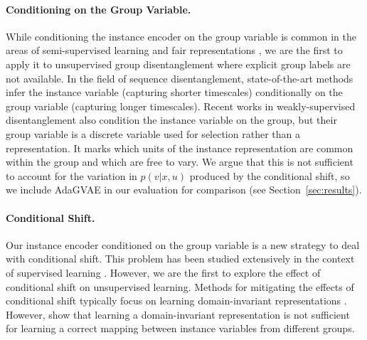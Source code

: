 \documentclass{article} %
\newcommand{\todo}[1]{\textcolor{red}{#1}}
\begin{document}
\paragraph{Conditioning on the Group Variable.} While conditioning the instance encoder on the group variable is common in the areas of semi-supervised learning and fair representations \citep{Kingma2014Semisupervised, Louizos2016TheVF}, we are the first to apply it to unsupervised group disentanglement where explicit group labels are not available. In the field of sequence disentanglement, state-of-the-art methods \citep{Hsu2017UnsupervisedLO, Denton2017UnsupervisedLO, Li2018DisentangledSA} infer the instance variable (capturing shorter timescales) conditionally on the group variable (capturing longer timescales). Recent works in weakly-supervised disentanglement \citep{Shu2020Weakly, Locatello2019ChallengingCA, Roeder2019Efficient} also condition the instance variable on the group, but their group variable is a discrete variable used for selection rather than a representation. It marks which units of the instance representation are common within the group and which are free to vary. We argue that this is not sufficient to account for the variation in $p(v | x, u)$ produced by the conditional shift, so we include AdaGVAE \citep{Locatello2020WeaklySupervisedDW} in our evaluation for comparison (see Section~\ref{sec:results}).


\paragraph{Conditional Shift.} Our instance encoder conditioned on the group variable is a new strategy to deal with conditional shift. This problem has been studied extensively in the context of supervised learning \citep{Zhang2013DomainAU, Gong2016Domain}. However, we are the first to explore the effect of conditional shift on unsupervised learning. Methods for mitigating the effects of conditional shift typically focus on learning domain-invariant representations \citep{BenDavid2009A}. However, \citet{Zhao2019On} show that learning a domain-invariant representation is not sufficient for learning a correct mapping between instance variables from different groups.
\end{document}
